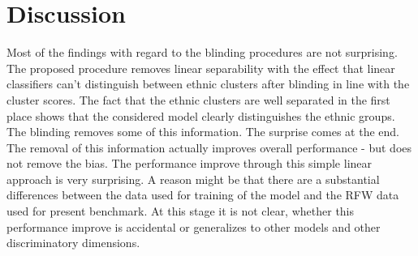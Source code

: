 \documentclass{report}
\begin{document}
\section{Discussion}

Most of the findings with regard to the blinding procedures are not surprising. The proposed procedure removes linear separability with the effect that linear classifiers can't distinguish between ethnic clusters after blinding in line with the cluster scores. The fact that the ethnic clusters are well separated in the first place shows that the considered model clearly distinguishes the ethnic groups. The blinding removes some of this information. The surprise comes at the end. The removal of this information actually improves overall performance - but does not remove the bias. The performance improve through this simple linear approach is very surprising. A reason might be that there are a substantial differences between the data used for training of the model and the RFW data used for present benchmark. At this stage it is not clear, whether this performance improve is accidental or generalizes to other models and other discriminatory dimensions.
\end{document}

